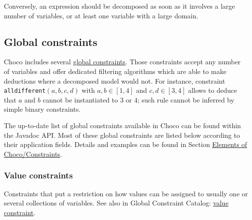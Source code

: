 Conversely, an expression should be decomposed as soon as it involves a large number of variables, or at least one variable with a large domain.


\subsection{Global constraints}\label{model:advancedconstraints}\hypertarget{model:advancedconstraints}{}
Choco includes several \href{http://www.emn.fr/x-info/sdemasse/gccat/}{global constraints}. Those constraints accept any number of variables and offer dedicated filtering algorithms which are able to make deductions where a decomposed model would not.
For instance, constraint \texttt{alldifferent}$(a,b,c,d)$ with $a,b\in[1,4]$ and $c,d\in[3,4]$ allows to deduce that $a$ and $b$ cannot be instantiated to $3$ or $4$; such rule cannot be inferred by simple binary constraints. 

The up-to-date list of global constraints available in Choco can be found within the Javadoc API.
Most of these global constraints are listed below according to their application fields.
Details and examples can be found in Section \hyperlink{ch:constraints}{Elements of Choco/Constraints}.
\subsubsection{Value constraints}\label{model:valueconstraints}\hypertarget{model:valueconstraints}{}
Constraints that put a restriction on how values can be assigned to usually one or several collections of variables.
See also in Global Constraint Catalog: \href{http://www.emn.fr/x-info/sdemasse/gccat/Kvalue_constraint.html}{value constraint}.

